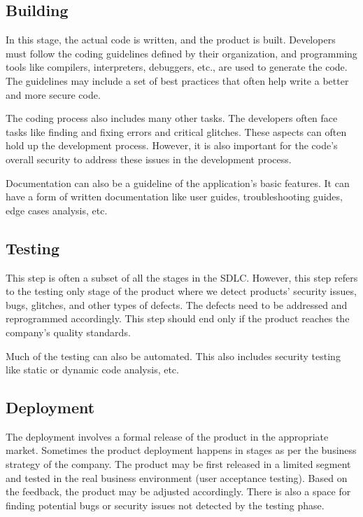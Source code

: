 \documentclass[12pt,a4,twoside]{article}
\begin{document}
\subsection{Building}

In this stage, the actual code is written, and the product is built. Developers must follow the coding guidelines defined by their organization, and programming tools like compilers, interpreters, debuggers, etc., are used to generate the code. The guidelines may include a set of best practices that often help write a better and more secure code. \cite{sdlc_tutorials_point}

The coding process also includes many other tasks. The developers often face tasks like finding and fixing errors and critical glitches. These aspects can often hold up the development process. However, it is also important for the code's overall security to address these issues in the development process. \cite{sdlc_phoenix}

Documentation can also be a guideline of the application's basic features. It can have a form of written documentation like user guides, troubleshooting guides, edge cases analysis, etc. \cite{sdlc_phoenix}

\subsection{Testing}

This step is often a subset of all the stages in the SDLC. However, this step refers to the testing only stage of the product where we detect products' security issues, bugs, glitches, and other types of defects. The defects need to be addressed and reprogrammed accordingly. This step should end only if the product reaches the company's quality standards. \cite{sdlc_tutorials_point}

Much of the testing can also be automated. This also includes security testing like static or dynamic code analysis, etc. \cite{sdlc_phoenix}

\subsection{Deployment}

The deployment involves a formal release of the product in the appropriate market. Sometimes the product deployment happens in stages as per the business strategy of the company. The product may be first released in a limited segment and tested in the real business environment (user acceptance testing). Based on the feedback, the product may be adjusted accordingly. There is also a space for finding potential bugs or security issues not detected by the testing phase. \cite{sdlc_tutorials_point}
\end{document}
